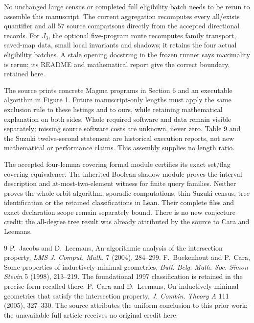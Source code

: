 \documentclass[11pt,a4paper]{article}
\begin{document}
No unchanged large census or completed full eligibility batch needs to
be rerun to assemble this manuscript. The current aggregation recomputes
every all/exists quantifier and all 57 source comparisons directly from
the accepted directional records. For $J_3$, the optional five-program
route recomputes family transport, saved-map data, small local invariants
and shadows; it retains the four actual eligibility batches. A stale
opening docstring in the frozen runner says maximality is rerun; its
README and mathematical report give the correct boundary, retained here.

The source prints concrete Magma programs in Section 6 and an executable
algorithm in Figure 1. Future manuscript-only lengths must apply the
same exclusion rule to these listings and to ours, while retaining
mathematical explanation on both sides. Whole required software and
data remain visible separately; missing source software costs are
unknown, never zero. Table 9 and the Suzuki twelve-second statement
are historical execution reports, not new mathematical or performance
claims. This assembly supplies no length ratio.

The accepted four-lemma covering formal module certifies its exact
set/flag covering equivalence. The inherited Boolean-shadow module
proves the interval description and at-most-two-element witness for
finite query families. Neither proves the whole orbit algorithm,
sporadic computations, thin Suzuki census, tree identification or the
retained classifications in Lean. Their complete files and exact
declaration scope remain separately bound. There is no new conjecture
credit: the all-degree tree result was already attributed by the source
to Cara and Leemans.

\begin{thebibliography}{9}
 P.~Jacobs and D.~Leemans, An algorithmic analysis of the
intersection property, \emph{LMS J. Comput. Math.} 7 (2004), 284--299.
 F.~Buekenhout and P.~Cara, Some properties of
inductively minimal geometries, \emph{Bull. Belg. Math. Soc. Simon Stevin}
5 (1998), 213--219. The foundational 1997 classification is retained
in the precise form recalled there.
 P.~Cara and D.~Leemans, On inductively minimal
geometries that satisfy the intersection property,
\emph{J. Combin. Theory A} 111 (2005), 327--330.
The source attributes the uniform conclusion to this prior work;
the unavailable full article receives no original credit here.
\end{thebibliography}
\end{document}

